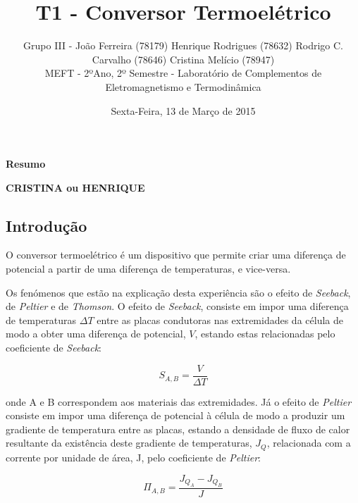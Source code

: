 \documentclass[9pt]{extarticle}
\renewenvironment{abstract}
 {\small
  \begin{center}
  \bfseries \abstractname\vspace{-.5em}\vspace{0pt}
  \end{center}
  \list{}{
    \setlength{\leftmargin}{0cm}%
    \setlength{\rightmargin}{\leftmargin}%
  }%
  \item\relax}
 {\endlist}
\renewcommand{\abstractname}{Resumo}
\begin{document}
\title {\bf \huge T1 - Conversor Termoelétrico}
\author
{{\small Grupo III - João Ferreira (78179) Henrique Rodrigues (78632) Rodrigo C. Carvalho (78646) Cristina Melício (78947)} \\
{\small MEFT - 2ºAno, 2º Semestre - Laboratório de Complementos de Eletromagnetismo e Termodinâmica}}
\date{{\small Sexta-Feira, 13 de Março de 2015}}
\maketitle

\begin{abstract}
\par \textbf{CRISTINA ou HENRIQUE}
\end{abstract}

\begin{multicols}{2}

\section{Introdução}

\par O conversor termoelétrico é um dispositivo que permite criar uma diferença de potencial a partir de uma diferença de temperaturas, e vice-versa. 

\par Os fenómenos que estão na explicação desta experiência são o efeito de \textit{Seeback}, de \textit{Peltier} e de \textit{Thomson}. O efeito de \textit{Seeback}, consiste em impor uma diferença de temperaturas  $\Delta T$ entre as placas condutoras nas extremidades da célula de modo a obter uma diferença de potencial, $V$, estando estas relacionadas pelo coeficiente de \textit{Seeback}:

\begin{equation}
S_{A,B} = \frac{V}{\Delta T}
\end{equation}

\par onde A e B correspondem aos materiais das extremidades. Já o efeito de \textit{Peltier} consiste em impor uma diferença de potencial à célula de modo a produzir um gradiente de temperatura entre as placas, estando a densidade de fluxo de calor resultante da existência deste gradiente de temperaturas, $J_Q$, relacionada com a corrente por unidade de área, J, pelo coeficiente de \textit{Peltier}:

\begin{equation}
\Pi_{A,B} = \frac{J_{Q_{A}}-J_{Q_{B}}}{J}
\end{equation}


\end{multicols}
\end{document}
